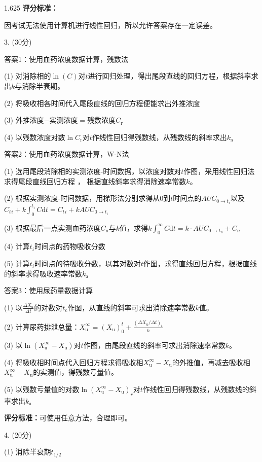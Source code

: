 \documentclass[12pt, a4paper]{article}
\begin{document}
\begin{spacing}{1.625}
{\bf 评分标准：}

因考试无法使用计算机进行线性回归，所以允许答案存在一定误差。

3. (30分)

答案1：使用血药浓度数据计算，残数法

(1) 对消除相的$\ln (C)$对$t$进行回归处理，得出尾段直线的回归方程，根据斜率求出$k$与消除半衰期。

(2) 将吸收相各时间代入尾段直线的回归方程便能求出外推浓度

(3) 外推浓度$-$实测浓度$=$残数浓度$C_\mathrm{r}$
 
(4) 以残数浓度对数$\ln C_\mathrm{r}$对$t$作线性回归得残数线，从残数线的斜率求出$k_\mathrm{a}$


答案2：使用血药浓度数据计算，W-N法

(1) 选用尾段消除相的实测浓度-时间数据，以浓度对数对$t$作图，采用线性回归法求得尾段直线回归方程 ， 根据直线斜率求得消除速率常数$k$。

(2) 根据实测浓度-时间数据，用梯形法分别求得从0到$t$时间点的$AUC_{0\to t_i}$以及$C{_t{_i}}+k\int_{0}^{t_i}C\mathrm{d}t=C_t{_i}+kAUC_{0\to t_i}$

(3) 根据最后一点实测血药浓度$C_\mathrm{n}$与$k$值，求得$k\int_{0}^{\infty}C\mathrm{d}t=k\cdot AUC_{0\to t_n}+C_n$

(4) 计算$t{_i}$时间点的药物吸收分数

(5) 计算$t{_i}$时间点的待吸收分数，以其对数对$t$作图，求得直线回归方程，根据直线的斜率求得吸收速率常数$k_\mathrm{a}$

答案3：使用尿药量数据计算

(1) 以$\frac{\Delta X_{\mathrm{u}}}{\Delta t}$的对数对$t_\mathrm{c}$作图，从直线的斜率可求出消除速率常数$k$值。

(2) 计算尿药排泄总量：$X_\mathrm{u}^\infty = (X_\mathrm{u})_0^t + \frac{(\Delta X_\mathrm{u}/\Delta t)_t}{k} $

(3) 以$\ln{(X_\mathrm{u}^\infty - X_\mathrm{u})}$对$t$作图，由尾段直线的斜率可求出消除速率常数$k$。

(4) 将吸收相时间点代入回归方程求得吸收相$X_\mathrm{u}^\infty - X_\mathrm{u}$的外推值，再减去吸收相$X_\mathrm{u}^\infty - X_\mathrm{u}$的实测值，得残数亏量值。

(5) 以残数亏量值的对数$\ln (X_\mathrm{u}^\infty - X_\mathrm{u})_r$对$t$作线性回归得残数线，从残数线的斜率求出$k_\mathrm{a}$

{\bf 评分标准：}可使用任意方法，合理即可。

4. (20分)

(1) 消除半衰期$t_{1/2}$


\end{spacing}
\end{document}
